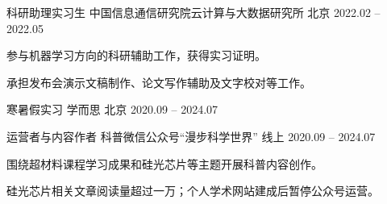 
\begin{cventries}
  \cventry
    {科研助理实习生}
    {中国信息通信研究院\enskip 云计算与大数据研究所}
    {北京}
    {2022.02 -- 2022.05}
    {
      \begin{cvitems}
        \item {参与机器学习方向的科研辅助工作，获得实习证明。}
        \item {承担发布会演示文稿制作、论文写作辅助及文字校对等工作。}
      \end{cvitems}
    }

  \cventry
    {寒暑假实习}
    {学而思}
    {北京}
    {2020.09 -- 2024.07}
    {}

  \cventry
    {运营者与内容作者}
    {科普微信公众号“漫步科学世界”}
    {线上}
    {2020.09 -- 2024.07}
    {
      \begin{cvitems}
        \item {围绕超材料课程学习成果和硅光芯片等主题开展科普内容创作。}
        \item {硅光芯片相关文章阅读量超过一万；个人学术网站建成后暂停公众号运营。}
      \end{cvitems}
    }
\end{cventries}
